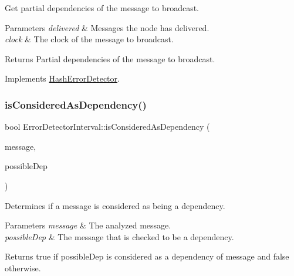 Get partial dependencies of the message to broadcast. 


\begin{DoxyParams}{Parameters}
{\em delivered} & Messages the node has delivered. \\
\hline
{\em clock} & The clock of the message to broadcast. \\
\hline
\end{DoxyParams}
\begin{DoxyReturn}{Returns}
Partial dependencies of the message to broadcast. 
\end{DoxyReturn}


Implements \hyperlink{class_hash_error_detector_a5b9f7e8a6f63b1582e912102021c2d8d}{Hash\+Error\+Detector}.

\mbox{\label{class_error_detector_interval_a27cb3ca9d7e5c3ddda9ee5ee66f182ed}} 
\subsubsection{\texorpdfstring{is\+Considered\+As\+Dependency()}{isConsideredAsDependency()}}
{\footnotesize\ttfamily bool Error\+Detector\+Interval\+::is\+Considered\+As\+Dependency (\begin{DoxyParamCaption}\item[{const \hyperlink{structures_8h_a7e7bdc1d2fff8a9436f2f352b2711ed6}{message\+Info} \&}]{message,  }\item[{const \hyperlink{structures_8h_a7e7bdc1d2fff8a9436f2f352b2711ed6}{message\+Info} \&}]{possible\+Dep }\end{DoxyParamCaption})\hspace{0.3cm}{\ttfamily [virtual]}}



Determines if a message is considered as being a dependency. 


\begin{DoxyParams}{Parameters}
{\em message} & The analyzed message. \\
\hline
{\em possible\+Dep} & The message that is checked to be a dependency. \\
\hline
\end{DoxyParams}
\begin{DoxyReturn}{Returns}
true if possible\+Dep is considered as a dependency of message and false otherwise. 
\end{DoxyReturn}


